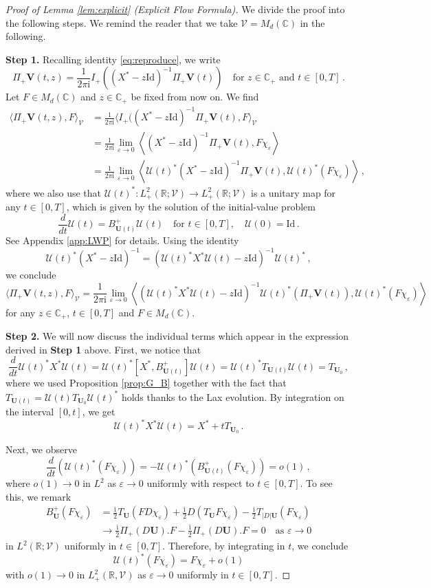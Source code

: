 \documentclass[11pt,reqno]{amsart}
\theoremstyle{definition}
\theoremstyle{remark}
\theoremstyle{remark}
\numberwithin{equation}{section}
\newcommand{\C}{\mathbb{C}}
\newcommand{\R}{\mathbb{R}}
\newcommand{\UU}{\mathcal{U}}
\newcommand{\VV}{\mathcal{V}}
\newcommand{\be}{\begin{equation}}
\newcommand{\ee}{\end{equation}}
\newcommand{\eps}{\varepsilon}
\newcommand{\ii}{\mathrm{i}}
\newcommand{\Vb}{\mathbf{V}}
\newcommand{\Ub}{\mathbf{U}}
\newcommand{\id}{\mathrm{Id}}
\newcommand{\Ds}{|D|}
\begin{document}
\begin{proof}[Proof of Lemma \ref{lem:explicit} (Explicit Flow Formula)]
We divide the proof into the following steps. We remind the reader that we take $\VV = M_d(\C)$ in the following.

\medskip
\textbf{Step 1.} Recalling identity \eqref{eq:reproduce}, we  write
$$
\Pi_+ \Vb(t,z) = \frac{1}{2 \pi \ii} I_+((X^*-z \id)^{-1} \Pi_+\Vb(t)) \quad \mbox{for $z \in \C_+$ and $t \in [0,T]$} \, .
$$
Let $F \in M_d(\C)$ and $z \in \C_+$ be fixed from now on. We find
\begin{align*}
\langle \Pi_+ \Vb(t,z), F \rangle_\VV & = \frac{1}{2 \pi \ii} \langle I_+((X^*-z \id)^{-1} \Pi_+ \Vb(t), F \rangle_\VV \\
&= \frac{1}{2 \pi \ii} \lim_{\eps \to 0} \left \langle (X^*-z \id)^{-1} \Pi_+ \Vb(t), F \chi_\eps \right \rangle \\
& = \frac{1}{2 \pi \ii} \lim_{\eps \to 0} \left \langle \UU(t)^* (X^*- z \id)^{-1} \Pi_+ \Vb(t), \UU(t)^* (F \chi_\eps) \right \rangle \, ,
\end{align*}
where we also use that $\UU(t)^* : L^2_+(\R; \VV) \to L^2_+(\R; \VV)$ is a unitary map for any $t \in [0,T]$, which is given by the solution of the initial-value problem
$$
\frac{d}{dt} \UU(t) = B_{\Ub(t)}^+ \UU(t) \quad \mbox{for $t \in [0,T]$}, \quad \UU(0) = \id \, .
$$
See Appendix \ref{app:LWP} for details. Using the identity
$$
\UU(t)^* (X^*-z \id)^{-1} = (\UU(t)^* X^* \UU(t) - z \id)^{-1} \UU(t)^* \, ,
$$
we conclude 
$$
\langle \Pi_+ \Vb(t,z), F \rangle_\VV = \frac{1}{2 \pi \ii} \lim_{\eps \to 0} \left \langle (\UU(t)^* X^* \UU(t) - z \id)^{-1} \UU(t)^* (\Pi_+ \Vb(t)), \UU(t)^*(F \chi_\eps) \right  \rangle 
$$
for any $z \in \C_+$, $t \in [0,T]$ and $F \in M_d(\C)$.

\medskip
\textbf{Step 2.} We will now discuss the individual terms which appear in the expression derived in \textbf{Step 1} above. First, we notice that
$$
\frac{d}{dt} \UU(t)^* X^* \UU(t) = \UU(t)^* [X^*, B_{\Ub(t)}^+] \UU(t) = \UU(t)^* T_{\Ub(t)} \UU(t) = T_{\Ub_0} \, ,
$$ 
where we used Proposition \ref{prop:G_B} together with the fact that $T_{\Ub(t)} = \UU(t) T_{\Ub_0} \UU(t)^*$ holds thanks to the Lax evolution. By integration on the interval $[0,t]$, we get
\be \label{eq:explicit1}
\UU(t)^* X^* \UU(t) = X^* + t T_{\Ub_0} \, .
\ee

Next, we observe 
$$
\frac{d}{dt} ( \UU(t)^* (F \chi_\eps)) = -\UU(t)^*(B_{\Ub(t)}^+ (F \chi_\eps)) = o(1) \, ,
$$
where $o(1) \to 0$ in $L^2$ as $\eps \to 0$ uniformly with respect to $t \in [0,T]$. To see this, we remark
\begin{align*}
B_{\Ub}^+ (F \chi_\eps) & = \frac{\ii}{2} T_{\Ub}(F D\chi_\eps) + \frac{\ii}{2} D(T_{\Ub} F \chi_\eps) - \frac{\ii}{2} T_{\Ds \Ub}(F \chi_\eps) \\
& \to \frac{\ii}{2} \Pi_+(D \Ub). F -\frac{\ii}{2} \Pi_+(D\Ub). F = 0 \quad \mbox{as $\eps \to 0$}
\end{align*}
in $L^2(\R; \VV)$ uniformly in $t \in [0,T]$. Therefore, by integrating in $t$, we conclude 
\be \label{eq:explicit2}
\UU(t)^*(F \chi_\eps) = F \chi_\eps + o(1)
\ee
with $o(1) \to 0$ in $L^2_+(\R, \VV)$ as $\eps \to 0$ uniformly in $t \in [0,T]$. 


\end{proof}
\end{document}
